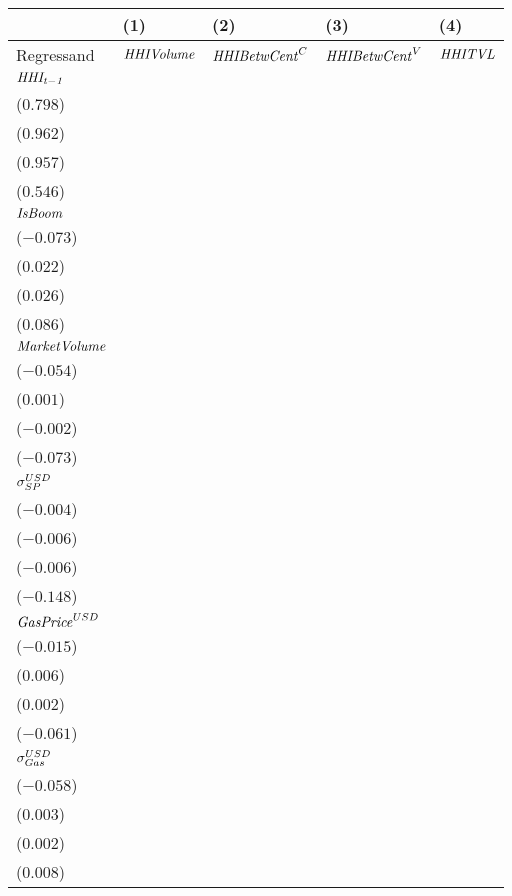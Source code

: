 \begin{tabular}{lllll}
\toprule
{} &                                      (1) &                                    (2) &                                    (3) &                                       (4) \\
\midrule
Regressand                 &                        ${\it HHIVolume}$ &                  ${\it HHIBetwCent}^C$ &                  ${\it HHIBetwCent}^V$ &                            ${\it HHITVL}$ \\
$\it HHI_{t-1}$            &    \makecell{$0.798^{***}$ \\ ($0.798$)} &  \makecell{$0.962^{***}$ \\ ($0.962$)} &  \makecell{$0.957^{***}$ \\ ($0.957$)} &     \makecell{$0.546^{***}$ \\ ($0.546$)} \\
${\it IsBoom}$             &  \makecell{$-0.004^{***}$ \\ ($-0.073$)} &  \makecell{$0.013^{***}$ \\ ($0.022$)} &  \makecell{$0.017^{***}$ \\ ($0.026$)} &     \makecell{$0.009^{***}$ \\ ($0.086$)} \\
${\it MarketVolume}$       &    \makecell{$-0.002^{*}$ \\ ($-0.054$)} &     \makecell{$0.000^{}$ \\ ($0.001$)} &   \makecell{$-0.001^{}$ \\ ($-0.002$)} &     \makecell{$-0.005^{*}$ \\ ($-0.073$)} \\
${\it \sigma}^{USD}_{SP}$  &     \makecell{$-0.010^{}$ \\ ($-0.004$)} &   \makecell{$-0.134^{}$ \\ ($-0.006$)} &   \makecell{$-0.150^{}$ \\ ($-0.006$)} &   \makecell{$-0.546^{***}$ \\ ($-0.148$)} \\
${\it GasPrice}^{USD}$     &     \makecell{$-3.508^{}$ \\ ($-0.015$)} &    \makecell{$13.792^{}$ \\ ($0.006$)} &     \makecell{$5.810^{}$ \\ ($0.002$)} &  \makecell{$-23.044^{***}$ \\ ($-0.061$)} \\
${\it \sigma}_{Gas}^{USD}$ &   \makecell{$-0.011^{**}$ \\ ($-0.058$)} &     \makecell{$0.006^{}$ \\ ($0.003$)} &     \makecell{$0.005^{}$ \\ ($0.002$)} &        \makecell{$0.002^{}$ \\ ($0.008$)} \\

\end{tabular}
